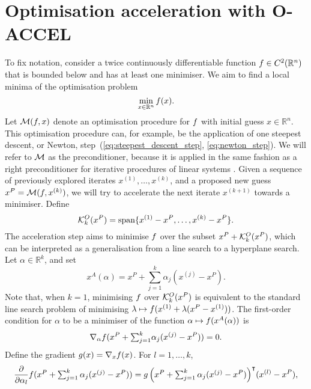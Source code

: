 \documentclass[main.tex]{subfiles}
\begin{document}
\section{Optimisation acceleration with O-ACCEL}\label{sec:algo_description}
To fix notation, consider a twice continuously differentiable function
$f\in C^2(\mathbb{R}^n)$ that is bounded below and has at least one
minimiser.  We aim to find a local minima of the optimisation problem
\begin{equation}
  \min_{x\in\mathbb{R}^n}f(x).
\end{equation}
Let $\mathcal{M}(f,x)$ denote an optimisation procedure for $f$ with
initial guess $x\in\mathbb{R}^n$. This optimisation procedure can, for
example, be the application of one steepest descent, or Newton,
step~(\ref{eq:steepest_descent_step}, \ref{eq:newton_step}). We will refer to
$\mathcal{M}$ as the preconditioner, because it is
applied in the same fashion as a right preconditioner for iterative
procedures of linear systems \citep{brune2015composing}.  Given a
sequence of previously explored iterates $x^{(1)},\dots,x^{(k)}$, and
a proposed new guess $x^P = \mathcal{M}(f,x^{(k)})$, we will try to
accelerate the next iterate $x^{(k+1)}$ towards a minimiser.  Define
\begin{equation}
  \mathcal{K}_{k}^O(x^P)=\mbox{span}\{x^{(1)}-x^P,\dots,x^{(k)}-x^P\}.
\end{equation}
The acceleration step aims to minimise $f$ over the subset
$x^P+\mathcal{K}_{k}^O(x^P)$, which can be interpreted as a generalisation
from a line search to a hyperplane search.  Let
$\alpha\in \mathbb{R}^k$, and set
\begin{equation}\label{eq:def_xA}
  x^A(\alpha) = x^P + \sum_{j=1}^k\alpha_j(x^{(j)}-x^P).
\end{equation}
Note that, when $k=1$, minimising $f$ over $\mathcal{K}_{k}^O(x^P)$ is
equivalent to the standard line search problem of minimising
$\lambda \mapsto f(x^{(1)}+\lambda (x^P-x^{(1)}))$.  The
first-order condition for $\alpha$ to be a minimiser of the function
$\alpha\mapsto f(x^A(\alpha))$ is
\begin{equation}
  \nabla_{\alpha} f(x^P+{\textstyle\sum_{j=1}^k}\alpha_j(x^{(j)}-x^P)) =0.
\end{equation}
Define the gradient $g(x)=\nabla_xf(x)$. For $l=1,\dots,k$,
\begin{equation}\label{eq:deriv_objective_alpha}
  \frac{\partial }{\partial \alpha_l}
  f({\textstyle x^P+\sum_{j=1}^k\alpha_j(x^{(j)}-x^P)})
  = {g\left({\textstyle x^P+\sum_{j=1}^k\alpha_j(x^{(j)}-x^P)}\right)}^\intercal
  (x^{(l)}-x^P),
\end{equation}
\end{document}
